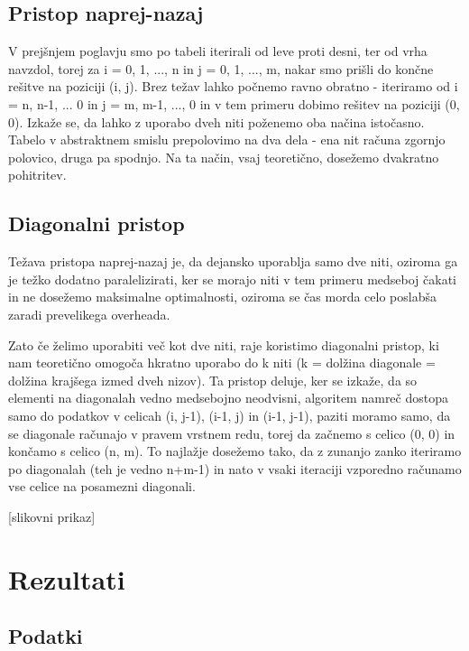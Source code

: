 \documentclass[a4paper,12pt,openright]{book}
\begin{document}
\section{Pristop naprej-nazaj}

V prejšnjem poglavju smo po tabeli iterirali od leve proti desni, ter od vrha navzdol, torej za i = 0, 1, ..., n in j = 0, 1, ..., m, nakar smo prišli do končne rešitve na poziciji (i, j). Brez težav lahko počnemo ravno obratno - iteriramo od i = n, n-1, ... 0 in j = m, m-1, ..., 0 in v tem primeru dobimo rešitev na poziciji (0, 0). Izkaže se, da lahko z uporabo dveh niti poženemo oba načina istočasno. Tabelo v abstraktnem smislu prepolovimo na dva dela - ena nit računa zgornjo polovico, druga pa spodnjo. Na ta način, vsaj teoretično, dosežemo dvakratno pohitritev. 

\section{Diagonalni pristop}

Težava pristopa naprej-nazaj je, da dejansko uporablja samo dve niti, oziroma ga je težko dodatno paralelizirati, ker se morajo niti v tem primeru medseboj čakati in ne dosežemo maksimalne optimalnosti, oziroma se čas morda celo poslabša zaradi prevelikega overheada. 

Zato če želimo uporabiti več kot dve niti, raje koristimo diagonalni pristop, ki nam teoretično omogoča hkratno uporabo do k niti (k = dolžina diagonale = dolžina krajšega izmed dveh nizov). Ta pristop deluje, ker se izkaže, da so elementi na diagonalah vedno medsebojno neodvisni, algoritem namreč dostopa samo do podatkov v celicah (i, j-1), (i-1, j) in (i-1, j-1), paziti moramo samo, da se diagonale računajo v pravem vrstnem redu, torej da začnemo s celico (0, 0) in končamo s celico (n, m). To najlažje dosežemo tako, da z zunanjo zanko iteriramo po diagonalah (teh je vedno n+m-1) in nato v vsaki iteraciji vzporedno računamo vse celice na posamezni diagonali. 

[slikovni prikaz]

\chapter{Rezultati}

\section{Podatki}
\end{document}
